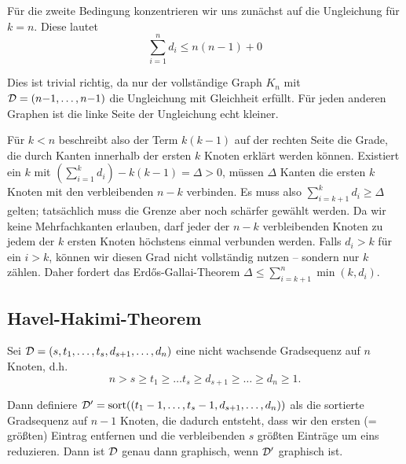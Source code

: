Für die zweite Bedingung konzentrieren wir uns zunächst auf die Ungleichung für $k = n$.
Diese lautet
\begin{equation}
    \sum_{i=1}^n d_i \le n(n-1) + 0
\end{equation}

Dies ist trivial richtig, da nur der vollständige Graph $K_n$ mit $\mathcal{D} = (n{-}1, \ldots, n{-}1)$ die Ungleichung mit Gleichheit erfüllt.
Für jeden anderen Graphen ist die linke Seite der Ungleichung echt kleiner.

Für $k < n$ beschreibt also der Term $k(k-1)$ auf der rechten Seite die Grade, die durch Kanten innerhalb der ersten $k$ Knoten erklärt werden können.
Existiert ein $k$ mit $(\sum_{i=1}^k d_i) - k(k-1) = \Delta > 0$, müssen $\Delta$ Kanten die ersten $k$ Knoten mit den verbleibenden $n - k$ verbinden.
Es muss also $\sum_{i=k+1}^k d_i \ge \Delta$ gelten; tatsächlich muss die Grenze aber noch schärfer gewählt werden.
Da wir keine Mehrfachkanten erlauben, darf jeder der $n-k$ verbleibenden Knoten zu jedem der $k$ ersten Knoten höchstens einmal verbunden werden.
Falls $d_i > k$ für ein $i > k$, können wir diesen Grad nicht vollständig nutzen -- sondern nur $k$  zählen.
Daher fordert das Erd\H{o}s-Gallai-Theorem $\Delta \le \sum_{i=k+1}^n \min(k, d_i)$.

\subsection{Havel-Hakimi-Theorem}
\begin{theorem}
    Sei $\mathcal{D} = (s, t_1, \ldots, t_s, d_{s+1}, \ldots, d_n)$ eine nicht wachsende Gradsequenz auf $n$ Knoten, d.h.
    \begin{equation}
        n > s \ge t_1 \ge \ldots t_s \ge d_{s+1} \ge \ldots \ge d_n \ge 1.
    \end{equation}

    \noindent
    Dann definiere $\mathcal{D}' = \text{sort}((t_1 - 1, \ldots, t_s - 1, d_{s+1}, \ldots, d_n))$ als die sortierte Gradsequenz auf $n-1$ Knoten,
    die dadurch entsteht, dass wir den ersten (= größten) Eintrag entfernen und die verbleibenden $s$ größten Einträge um eins reduzieren.
    Dann ist $\mathcal{D}$ genau dann graphisch, wenn $\mathcal{D}'$ graphisch ist.
\end{theorem}

